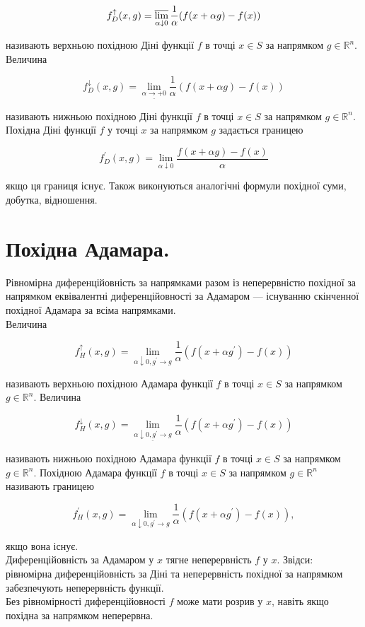 \documentclass[12pt,a4paper]{extarticle}
\numberwithin{section}{part}
\begin{document}
$$
f_{D}^{\uparrow}(x, g)=\varlimsup_{\alpha \downarrow 0} \frac{1}{\alpha}(f(x+\alpha g)-f(x))
$$

називають верхньою похідною Діні функції $f$ в точці $x \in S$ за напрямком $g \in \mathbb{R}^{n}$.\\
Величина

$$
f_{D}^{\downarrow}(x, g)=\lim _{\underline{\alpha \rightarrow+0}} \frac{1}{\alpha}(f(x+\alpha g)-f(x))
$$

називають нижньою похідною Діні функції $f$ в точці $x \in S$ за напрямком $g \in \mathbb{R}^{n}$.\\
Похідна Діні функції $f$ у точці $x$ за напрямком $g$ задається границею

$$
f_{D}^{\prime}(x, g)=\lim _{\alpha \downarrow 0} \frac{f(x+\alpha g)-f(x)}{\alpha}
$$

якщо ця границя існує. Також виконуються аналогічні формули похідної суми, добутка, відношення.

\section{Похідна Адамара.}
Рівномірна диференційовність за напрямками разом із неперервністю похідної за напрямком еквівалентні диференційовності за Адамаром --- існуванню скінченної похідної Адамара за всіма напрямками.\\
Величина

$$
f_{H}^{\uparrow}(x, g)=\lim _{\alpha \downarrow 0, g^{\prime} \rightarrow g} \frac{1}{\alpha}\left(f\left(x+\alpha g^{\prime}\right)-f(x)\right)
$$

називають верхньою похідною Адамара функції $f$ в точці $x \in S$ за напрямком $g \in \mathbb{R}^{n}$. Величина

$$
f_{H}^{\downarrow}(x, g)=\lim _{\underline{\alpha \downarrow 0, g^{\prime} \rightarrow g}} \frac{1}{\alpha}\left(f\left(x+\alpha g^{\prime}\right)-f(x)\right)
$$

називають нижньою похідною Адамара функції $f$ в точці $x \in S$ за напрямком $g \in \mathbb{R}^{n}$. Похідною Адамара функції $f$ в точці $x \in S$ за напрямком $g \in \mathbb{R}^{n}$ називають границею

$$
f_{H}^{\prime}(x, g)=\lim _{\alpha \downarrow 0, g^{\prime} \rightarrow g} \frac{1}{\alpha}\left(f\left(x+\alpha g^{\prime}\right)-f(x)\right),
$$

якщо вона існує.\\
Диференційовність за Адамаром у $x$ тягне неперервність $f$ у $x$. Звідси: рівномірна диференційовність за Діні та неперервність похідної за напрямком забезпечують неперервність функції.\\
Без рівномірності диференційовності $f$ може мати розрив у $x$, навіть якщо похідна за напрямком неперервна.
\end{document}
